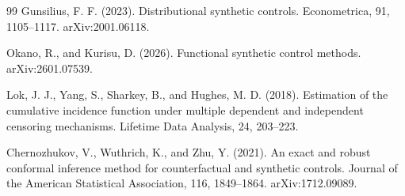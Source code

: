 \documentclass{article}
\begin{document}
\begin{thebibliography}{99}
   Gunsilius, F. F. (2023). Distributional synthetic controls. Econometrica, 91, 1105--1117. arXiv:2001.06118.

   Okano, R., and Kurisu, D. (2026). Functional synthetic control methods. arXiv:2601.07539.

   Lok, J. J., Yang, S., Sharkey, B., and Hughes, M. D. (2018). Estimation of the cumulative incidence function under multiple dependent and independent censoring mechanisms. Lifetime Data Analysis, 24, 203--223.

   Chernozhukov, V., Wuthrich, K., and Zhu, Y. (2021). An exact and robust conformal inference method for counterfactual and synthetic controls. Journal of the American Statistical Association, 116, 1849--1864. arXiv:1712.09089.

\end{thebibliography}
\end{document}
